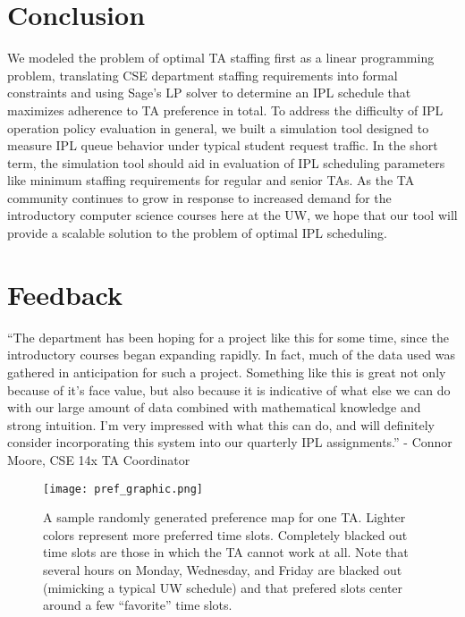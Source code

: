 \documentclass{article}
\begin{document}
\begin{multicols}{2}
\section*{Conclusion}

We modeled the problem of optimal TA staffing first as a linear programming problem, translating CSE department staffing requirements into formal constraints and using Sage's LP solver to determine an IPL schedule that maximizes adherence to TA preference in total. To address the difficulty of IPL operation policy evaluation in general, we built a simulation tool designed to measure IPL queue behavior under typical student request traffic. In the short term, the simulation tool should aid in evaluation of IPL scheduling parameters like minimum staffing requirements for regular and senior TAs. As the TA community continues to grow in response to increased demand for the introductory computer science courses here at the UW, we hope that our tool will provide a scalable solution to the problem of optimal IPL scheduling.

\section*{Feedback}

``The department has been hoping for a project like this for some time, since the introductory courses began expanding rapidly. In fact, much of the data used was gathered in anticipation for such a project. Something like this is great not only because of it's face value, but also because it is indicative of what else we can do with our large amount of data combined with mathematical knowledge and strong intuition. I'm very impressed with what this can do, and will definitely consider incorporating this system into our quarterly IPL assignments.'' - Connor Moore, CSE 14x TA Coordinator




\begin{figure*}
\centering
\texttt{[image: pref\_graphic.png]}
\caption{\small{A sample randomly generated preference map for one TA. Lighter colors represent more preferred time slots. Completely blacked out time slots are those in which the TA cannot work at all. Note that several hours on Monday, Wednesday, and Friday are blacked out (mimicking a typical UW schedule) and that prefered slots center around a few ``favorite'' time slots.}}
\end{figure*}


\end{multicols}
\end{document}
